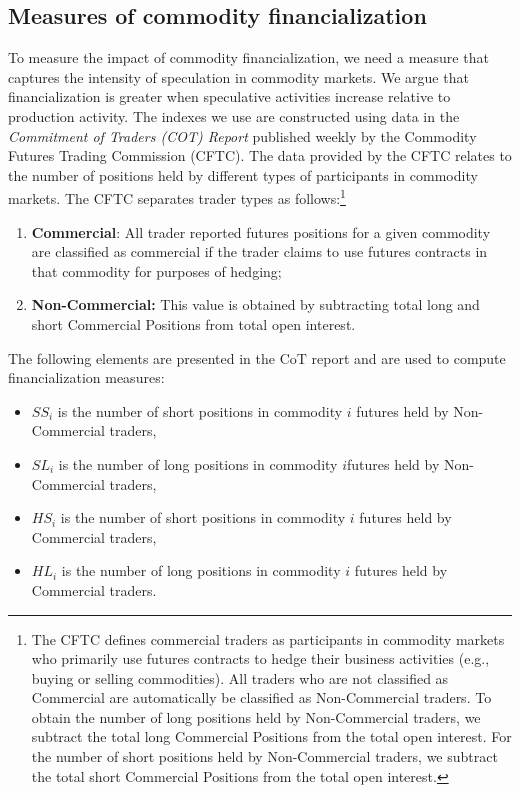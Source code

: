 \documentclass[12pt]{article}
\begin{document}
\subsection{Measures of commodity financialization}
To measure the impact of commodity financialization, we need a measure that captures the intensity of speculation in commodity markets. We argue that financialization is greater when speculative activities increase relative to production activity. The indexes we use are constructed using data in the \emph{Commitment of Traders (COT) Report} published weekly by the Commodity Futures Trading Commission (CFTC).  The data provided by the CFTC relates to the number of positions held by different types of participants in commodity markets. The CFTC separates trader types as follows:\footnote{The CFTC defines commercial traders as participants in commodity markets who primarily use futures contracts to hedge their business activities (e.g., buying or selling commodities). All traders who are not classified as Commercial are automatically be classified as Non-Commercial traders. To obtain the number of long positions held by Non-Commercial traders, we subtract the total long Commercial Positions from the total open interest. For the number of short positions held by Non-Commercial traders, we subtract the total short Commercial Positions from the total open interest.}


\begin{enumerate}
\item \textbf{Commercial}: All trader reported futures positions for a given commodity are classified as commercial if the trader claims to use futures contracts in that commodity for purposes of hedging;
\item \textbf{Non-Commercial:} This value is obtained by subtracting total long and short Commercial Positions from  total open interest.
\end{enumerate}
  
The following elements are presented in the CoT report and are used to compute financialization measures:

\begin{itemize}
\item $SS_i$ is the number of short positions in commodity $i$ futures held by Non-Commercial traders,
\item $SL_i$  is the number of long positions in commodity $i$futures held by Non-Commercial traders,
\item $HS_i$ is the number of short positions in commodity $i$ futures held by Commercial traders, 
\item $HL_i$ is the number of long positions in commodity $i$ futures held by Commercial traders.
\end{itemize}
\end{document}

